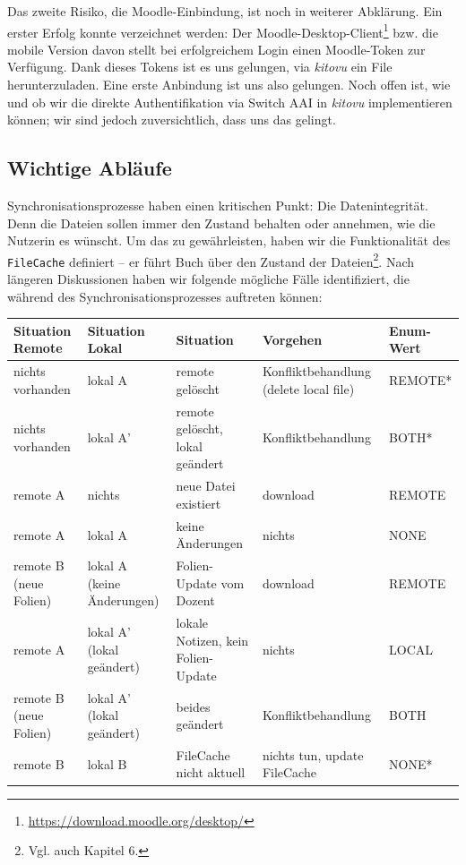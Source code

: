 \documentclass[a4paper]{article}
\begin{document}
Das zweite Risiko, die Moodle-Einbindung, ist noch in weiterer Abklärung. Ein erster Erfolg konnte verzeichnet werden: Der Moodle-Desktop-Client\footnote{\url{https://download.moodle.org/desktop/}} bzw. die mobile Version davon stellt bei erfolgreichem Login einen Moodle-Token zur Verfügung. Dank dieses Tokens ist es uns gelungen, via \emph{kitovu} ein File herunterzuladen. Eine erste Anbindung ist uns also gelungen. Noch offen ist, wie und ob wir die direkte Authentifikation via Switch AAI in \emph{kitovu} implementieren können; wir sind jedoch zuversichtlich, dass uns das gelingt.

\subsection{Wichtige Abläufe}

Synchronisationsprozesse haben einen kritischen Punkt: Die Datenintegrität. Denn die Dateien sollen immer den Zustand behalten oder annehmen, wie die Nutzerin es wünscht. Um das zu gewährleisten, haben wir die Funktionalität des \verb|FileCache| definiert -- er führt Buch über den Zustand der Dateien\footnote{Vgl. auch Kapitel 6.}. Nach längeren Diskussionen haben wir folgende mögliche Fälle identifiziert, die während des Synchronisationsprozesses auftreten können:

\begin{tabulary}{\linewidth}{LLLLl}
	\toprule
	    \bfseries Situation Remote &
	    \bfseries Situation Lokal &
	    \bfseries Situation &
	    \bfseries Vorgehen &
	    \bfseries Enum-Wert\\
	\midrule
nichts vorhanden &	lokal A &	remote gelöscht &	Konfliktbehandlung (delete local file) & 	REMOTE*\\ \hline
nichts vorhanden &	lokal A' &	remote gelöscht, lokal geändert&	Konfliktbehandlung &	BOTH*\\ \hline
remote A &	nichts &	neue Datei existiert &	download &	REMOTE\\ \hline
remote A &	lokal A &	keine Änderungen &	nichts& 	NONE\\\hline
remote B (neue Folien) &	lokal A (keine Änderungen) &	Folien-Update vom Dozent &	download &	REMOTE\\\hline
remote A &	lokal A' (lokal geändert) &	lokale Notizen, kein Folien-Update &	nichts &	LOCAL\\\hline
remote B (neue Folien) &	lokal A' (lokal geändert) &	beides geändert &	Konfliktbehandlung &	BOTH\\\hline
remote B &	lokal B &	FileCache nicht aktuell &	nichts tun, update FileCache &	NONE*\\\hline

\end{tabulary}
\end{document}

